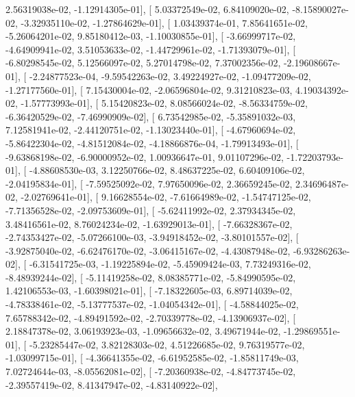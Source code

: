 \documentclass{article}
\begin{document}
          2.56319038e-02,  -1.12914305e-01],
       [  5.03372549e-02,   6.84109020e-02,  -8.15890027e-02,
         -3.32935110e-02,  -1.27864629e-01],
       [  1.03439374e-01,   7.85641651e-02,  -5.26064201e-02,
          9.85180412e-03,  -1.10030855e-01],
       [ -3.66999717e-02,  -4.64909941e-02,   3.51053633e-02,
         -1.44729961e-02,  -1.71393079e-01],
       [ -6.80298545e-02,   5.12566097e-02,   5.27014798e-02,
          7.37002356e-02,  -2.19608667e-01],
       [ -2.24877523e-04,  -9.59542263e-02,   3.49224927e-02,
         -1.09477209e-02,  -1.27177560e-01],
       [  7.15430004e-02,  -2.06596804e-02,   9.31210823e-03,
          4.19034392e-02,  -1.57773993e-01],
       [  5.15420823e-02,   8.08566024e-02,  -8.56334759e-02,
         -6.36420529e-02,  -7.46990909e-02],
       [  6.73542985e-02,  -5.35891032e-03,   7.12581941e-02,
         -2.44120751e-02,  -1.13023440e-01],
       [ -4.67960694e-02,  -5.86422304e-02,  -4.81512084e-02,
         -4.18866876e-04,  -1.79913493e-01],
       [ -9.63868198e-02,  -6.90000952e-02,   1.00936647e-01,
          9.01107296e-02,  -1.72203793e-01],
       [ -4.88608530e-03,   3.12250766e-02,   8.48637225e-02,
          6.60409106e-02,  -2.04195834e-01],
       [ -7.59525092e-02,   7.97650096e-02,   2.36659245e-02,
          2.34696487e-02,  -2.02769641e-01],
       [  9.16628554e-02,  -7.61664989e-02,  -1.54747125e-02,
         -7.71356528e-02,  -2.09753609e-01],
       [ -5.62411992e-02,   2.37934345e-02,   3.48416561e-02,
          8.76024234e-02,  -1.63929013e-01],
       [ -7.66328367e-02,  -2.74353427e-02,  -5.07266100e-03,
         -3.94918452e-02,  -3.80101557e-02],
       [ -3.92875040e-02,  -6.62476170e-02,  -3.06415167e-02,
         -4.43087948e-02,  -6.93286263e-02],
       [ -6.31541725e-03,  -1.19225894e-02,  -5.45909424e-03,
          7.73249316e-02,  -8.48939244e-02],
       [ -5.11419258e-02,   8.08385771e-02,  -5.84990595e-02,
          1.42106553e-03,  -1.60398021e-01],
       [ -7.18322605e-03,   6.89714039e-02,  -4.78338461e-02,
         -5.13777537e-02,  -1.04054342e-01],
       [ -4.58844025e-02,   7.65788342e-02,  -4.89491592e-02,
         -2.70339778e-02,  -4.13906937e-02],
       [  2.18847378e-02,   3.06193923e-03,  -1.09656632e-02,
          3.49671944e-02,  -1.29869551e-01],
       [ -5.23285447e-02,   3.82128303e-02,   4.51226685e-02,
          9.76319577e-02,  -1.03099715e-01],
       [ -4.36641355e-02,  -6.61952585e-02,  -1.85811749e-03,
          7.02724644e-03,  -8.05562081e-02],
       [ -7.20360938e-02,  -4.84773745e-02,  -2.39557419e-02,
          8.41347947e-02,  -4.83140922e-02],
\end{document}

